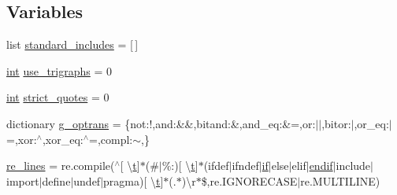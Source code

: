 \subsection*{Variables}
\begin{DoxyCompactItemize}
\item 
list \hyperlink{namespacewaflib_1_1_tools_1_1c__preproc_ab5ab2241e9fcbb11a870c209ef58871c}{standard\+\_\+includes} = \mbox{[}$\,$\mbox{]}
\item 
\hyperlink{xmltok_8h_a5a0d4a5641ce434f1d23533f2b2e6653}{int} \hyperlink{namespacewaflib_1_1_tools_1_1c__preproc_a09286f77860a605ca825531218d9b651}{use\+\_\+trigraphs} = 0
\item 
\hyperlink{xmltok_8h_a5a0d4a5641ce434f1d23533f2b2e6653}{int} \hyperlink{namespacewaflib_1_1_tools_1_1c__preproc_a1f10b9d6cbd8cd2e1a008d7f1f11890c}{strict\+\_\+quotes} = 0
\item 
dictionary \hyperlink{namespacewaflib_1_1_tools_1_1c__preproc_a4dad61a7e636c7f3b883f62ddf5d6389}{g\+\_\+optrans} = \{\textquotesingle{}not\textquotesingle{}\+:\textquotesingle{}!\textquotesingle{},\textquotesingle{}and\textquotesingle{}\+:\textquotesingle{}\&\&\textquotesingle{},\textquotesingle{}bitand\textquotesingle{}\+:\textquotesingle{}\&\textquotesingle{},\textquotesingle{}and\+\_\+eq\textquotesingle{}\+:\textquotesingle{}\&=\textquotesingle{},\textquotesingle{}or\textquotesingle{}\+:\textquotesingle{}$\vert$$\vert$\textquotesingle{},\textquotesingle{}bitor\textquotesingle{}\+:\textquotesingle{}$\vert$\textquotesingle{},\textquotesingle{}or\+\_\+eq\textquotesingle{}\+:\textquotesingle{}$\vert$=\textquotesingle{},\textquotesingle{}xor\textquotesingle{}\+:\textquotesingle{}$^\wedge$\textquotesingle{},\textquotesingle{}xor\+\_\+eq\textquotesingle{}\+:\textquotesingle{}$^\wedge$=\textquotesingle{},\textquotesingle{}compl\textquotesingle{}\+:\textquotesingle{}$\sim$\textquotesingle{},\}
\item 
\hyperlink{namespacewaflib_1_1_tools_1_1c__preproc_ada678a5cf9c24c522bee9fce52ad7b3e}{re\+\_\+lines} = re.\+compile(\textquotesingle{}$^\wedge$\mbox{[} \textbackslash{}\hyperlink{octave__test_8m_aaccc9105df5383111407fd5b41255e23}{t}\mbox{]}$\ast$(\#$\vert$\%\+:)\mbox{[} \textbackslash{}\hyperlink{octave__test_8m_aaccc9105df5383111407fd5b41255e23}{t}\mbox{]}$\ast$(ifdef$\vert$ifndef$\vert$\hyperlink{sndfile__save_8m_a55944e1fa1bcc1bfc6185bc610b0a930}{if}$\vert$else$\vert$elif$\vert$\hyperlink{sndfile__save_8m_a74c64864f5283ae06d4a981642a59af9}{endif}$\vert$include$\vert$import$\vert$define$\vert$undef$\vert$pragma)\mbox{[} \textbackslash{}\hyperlink{octave__test_8m_aaccc9105df5383111407fd5b41255e23}{t}\mbox{]}$\ast$(.$\ast$)\textbackslash{}r$\ast$\$\textquotesingle{},re.\+I\+G\+N\+O\+R\+E\+C\+A\+SE$\vert$re.\+M\+U\+L\+T\+I\+L\+I\+NE)
$$
\end{DoxyCompactItemize}

